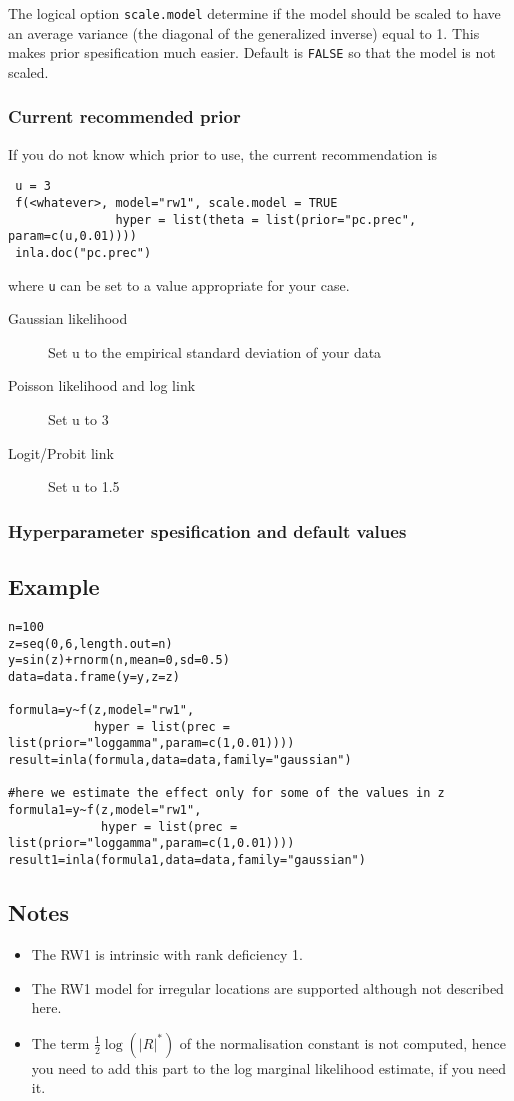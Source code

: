 \documentclass[a4paper,11pt]{article}
\begin{document}
The logical option \verb|scale.model| determine if the model should be
scaled to have an average variance (the diagonal of the generalized
inverse) equal to 1. This makes prior spesification much
easier. Default is \verb|FALSE| so that the model is not scaled.

\subsubsection*{Current recommended prior}
If you do not know which prior to use, the current recommendation is
\begin{verbatim}
 u = 3
 f(<whatever>, model="rw1", scale.model = TRUE
               hyper = list(theta = list(prior="pc.prec", param=c(u,0.01))))
 inla.doc("pc.prec")
\end{verbatim}
where {\tt u} can be set to a value appropriate for your case.
\begin{description}
\item[Gaussian likelihood] Set u to the empirical standard deviation of your data
\item[Poisson likelihood and log link] Set u to 3
\item[Logit/Probit link] Set u to 1.5
\end{description}

\subsubsection*{Hyperparameter spesification and default values}



\subsection*{Example}

\begin{verbatim}
n=100
z=seq(0,6,length.out=n)
y=sin(z)+rnorm(n,mean=0,sd=0.5)
data=data.frame(y=y,z=z)

formula=y~f(z,model="rw1",
            hyper = list(prec = list(prior="loggamma",param=c(1,0.01))))
result=inla(formula,data=data,family="gaussian")

#here we estimate the effect only for some of the values in z
formula1=y~f(z,model="rw1",
             hyper = list(prec = list(prior="loggamma",param=c(1,0.01))))
result1=inla(formula1,data=data,family="gaussian")
\end{verbatim}


\subsection*{Notes}

\begin{itemize}
\item The RW1 is intrinsic with rank deficiency 1.
\item The RW1 model for irregular locations are supported although not
    described here.
\item The term $\frac{1}{2}\log(|R|^{*})$ of the normalisation
    constant is not computed, hence you need to add this part to the
    log marginal likelihood estimate, if you need it.
\end{itemize}
\end{document}
